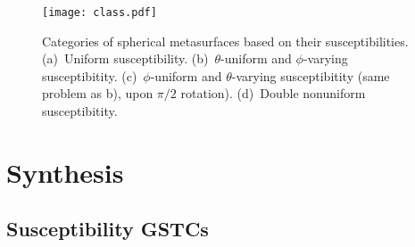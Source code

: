 \documentclass[journal,transaction]{IEEEtran}
\newcommand{\figref}{Fig.~\ref}
\begin{document}


\begin{figure}[!h]
    \centering
         \texttt{[image: class.pdf]}{
        }
        \caption{Categories of spherical metasurfaces based on their susceptibilities. (a)~Uniform susceptibility. (b)~$\theta$-uniform and $\phi$-varying susceptibitity. (c)~$\phi$-uniform and $\theta$-varying susceptibitity (same problem as b), upon $\pi/2$ rotation). (d)~Double nonuniform susceptibitity.}
   \label{FIG:class}
\end{figure}


\section{Synthesis}\label{sec:synthesis}
\subsection{Susceptibility GSTCs}\label{sec:synthesis_gstc}
\end{document}
